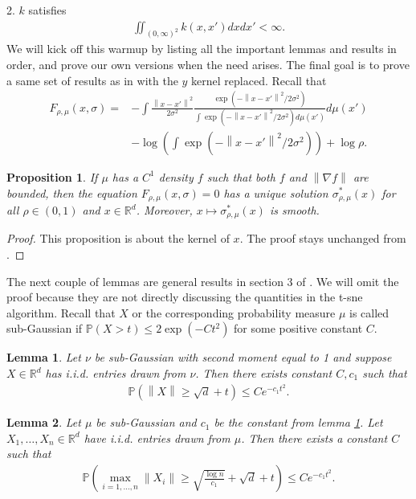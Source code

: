 \documentclass[10pt]{article}
\newcommand{\p}{\mathbb{P}}
\newcommand{\norm}[1]{\left\lVert#1\right\rVert}
\newtheorem{lemma}{\bf Lemma}
\newtheorem{proposition}{\bf Proposition}
\newenvironment{Proof of lemma}{\noindent{\bf Proof of Lemma}}{\hfill$\Box$\newline}
\newenvironment{Proof of claim}{\noindent{\bf Proof of claim}}{\hfill$\Box$\newline}
\newenvironment{Proof of theorem}{\noindent{\bf Proof of Theorem}}{\hfill\scriptsize{$\Box$}\newline}
\newenvironment{Proof of theorems}{\noindent{\bf Proof of Theorems}}{\hfill$\Box$\newline}
\newenvironment{Proof of proposition}{\noindent{\bf Proof of Proposition}}{\hfill$\Box$\newline}
\newenvironment{Proof of propositions}{\noindent{\bf Proof of Propositions}}{\hfill$\Box$\newline}
\newenvironment{Proof of exercise}{\noindent{\it Proof of Exercise:}}{\hfill$\Box$}
\numberwithin{equation}{section}
\begin{document}
2. $k$ satisfies
\begin{align}
    \iint_{(0,\infty)^2} k(x,x') dxdx' < \infty.
\end{align}
We will kick off this warmup by listing all the important lemmas and results in order, and prove our own versions when the need arises. The final goal is to prove a same set of results as in \cite{auffinger-tsne} with the $y$ kernel replaced.
Recall that
\begin{align}
    F_{\rho, \mu}(x,\sigma) = & - \int \frac{\norm{x-x'}^2}{2\sigma^2} \frac{\exp(-\norm{x-x'}^2/2\sigma^2)}{\int \exp(-\norm{x-x'}^2/2\sigma^2)d\mu(x')}d\mu(x') \nonumber \\
                              & - \log \left(\int \exp(-\norm{x-x'}^2/2\sigma^2)\right) +\log \rho.
\end{align}
\begin{proposition}
    If $\mu$ has a $C^1$ density $f$ such that both $f$ and $\norm{\nabla f}$ are bounded, then the equation $F_{\rho, \mu}(x,\sigma)=0$ has a unique solution $\sigma^*_{\rho,\mu}(x)$ for all $\rho \in (0,1)$ and $x \in \mathbb{R}^d$. Moreover, $x \mapsto \sigma^*_{\rho,\mu}(x)$ is smooth.
\end{proposition}
\begin{proof}
    This proposition is about the kernel of $x$. The proof stays unchanged from \cite{auffinger-tsne}.
\end{proof}
The next couple of lemmas are general results in section 3 of \cite{auffinger-tsne}. We will omit the proof because they are not directly discussing the quantities in the t-sne algorithm.  Recall that $X$ or the corresponding probability measure $\mu$ is called sub-Gaussian if $\p(X>t) \leq 2 \exp(-Ct^2)$ for some positive constant $C$.
\begin{lemma} \label{Gaussian_lemma}
    Let $\nu$ be sub-Gaussian with second moment equal to 1 and suppose $X \in \mathbb{R}^d$ has i.i.d. entries drawn from $\nu$. Then there exists constant $C, c_1$ such that
    \begin{align}
        \p(\norm{X} \geq \sqrt{d} + t) \leq Ce^{-c_1t^2}.
    \end{align}
\end{lemma}
\begin{lemma} \label{max_iid_lemma}
    Let $\mu$ be sub-Gaussian and $c_1$ be the constant from lemma \ref{Gaussian_lemma}. Let $X_1, \dots, X_n \in \mathbb{R}^d$ have i.i.d. entries drawn from $\mu$. Then there exists a constant $C$ such that
    \begin{align}
        \p \left (\max_{i=1,\dots,n}\norm{X_i} \geq \sqrt{\frac{\log n}{c_1}}+\sqrt{d}+t \right ) \leq Ce^{-c_1t^2}.
    \end{align}
\end{lemma}
\end{document}
